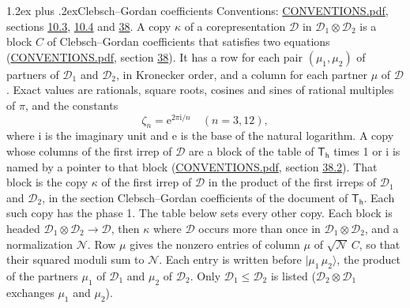 \documentclass[10pt,a4paper]{article}
\makeatletter
\renewcommand\section{\@startsection{section}{1}{\z@}{-3ex plus -1ex minus -.2ex}%
  {1.2ex plus .2ex}{\normalfont\large\sffamily\bfseries\color{parttitle}}}
\numberwithin{equation}{section}
\newcommand{\grp}[1]{\mathsf{#1}}
\newcommand{\iunit}{\mathrm{i}}
\newcommand{\expe}{\mathrm{e}}
\newcommand{\rootunity}[1]{\zeta_{#1}}
\newcommand{\irrprod}{\otimes}
\newcommand{\mult}{\kappa}
\newcommand{\intx}{\mu}
\newcommand{\cgnorm}{\mathcal{N}}
\newcommand{\prodket}[2]{\lvert {#1}\,{#2}\rangle}
\makeatother
\begin{document}
\section{Clebsch--Gordan coefficients}\label{s:clebsch_gordan}
Conventions: \href{../../CONVENTIONS.pdf}{CONVENTIONS.pdf}, sections \href{../../../rotation/CONVENTIONS.pdf\#conv.10.3}{10.3}, \href{../../../rotation/CONVENTIONS.pdf\#conv.10.4}{10.4} and \href{../../CONVENTIONS.pdf\#conv.38}{38}.
\leavevmode\label{n:index.copy}\label{n:matrix.cg.stored}A copy $\mult$ of a corepresentation $\mathcal{D}$ in $\mathcal{D}_1\irrprod\mathcal{D}_2$ is a block $C$ of Clebsch--Gordan coefficients that satisfies two equations (\href{../../CONVENTIONS.pdf}{CONVENTIONS.pdf}, section \href{../../CONVENTIONS.pdf\#conv.38}{38}). \label{n:index.cg}It has a row for each pair $(\intx_1, \intx_2)$ of partners of $\mathcal{D}_1$ and $\mathcal{D}_2$, in Kronecker order, and a column for each partner $\intx$ of $\mathcal{D}$.
\leavevmode\label{n:constant.root}\label{n:index.root.order}Exact values are rationals, square roots, cosines and sines of rational multiples of $\pi$, and the constants
\begin{equation}\label{e:constants}\rootunity{n} = \expe^{2\pi\iunit/n}\quad(n = 3, 12),\end{equation}
where $\iunit$ is the imaginary unit and $\expe$ is the base of the natural logarithm.
A copy whose columns of the first irrep of $\mathcal{D}$ are a block of the table of $\grp{T_{h}}$ times 1 or $\iunit$ is named by a pointer to that block (\href{../../CONVENTIONS.pdf}{CONVENTIONS.pdf}, section \href{../../CONVENTIONS.pdf\#conv.38.2}{38.2}). That block is the copy $\mult$ of the first irrep of $\mathcal{D}$ in the product of the first irreps of $\mathcal{D}_1$ and $\mathcal{D}_2$, in the section Clebsch--Gordan coefficients of the document of \href{../../../rotation/data/pdf/Th.pdf}{$\grp{T_{h}}$}. Each such copy has the phase 1. The table below sets every other copy.
Each block is headed $\mathcal{D}_1\irrprod\mathcal{D}_2\to\mathcal{D}$, then $\mult$ where $\mathcal{D}$ occurs more than once in $\mathcal{D}_1\irrprod\mathcal{D}_2$, and a normalization $\cgnorm$. Row $\intx$ gives the nonzero entries of column $\intx$ of $\sqrt{\cgnorm}\,C$, so that their squared moduli sum to $\cgnorm$. \label{n:vector.ket.product}Each entry is written before $\prodket{\intx_1}{\intx_2}$, the product of the partners $\intx_1$ of $\mathcal{D}_1$ and $\intx_2$ of $\mathcal{D}_2$. Only $\mathcal{D}_1 \le \mathcal{D}_2$ is listed ($\mathcal{D}_2\irrprod\mathcal{D}_1$ exchanges $\intx_1$ and $\intx_2$).
\end{document}
